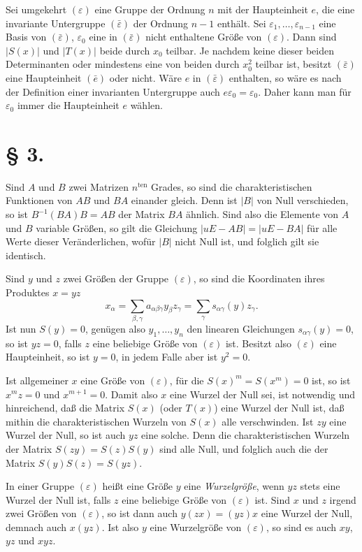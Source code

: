 \documentclass[11pt]{article}
\newcommand{\eps}{\varepsilon}
\newcommand{\ten}{\mathrm{ten}}
\begin{document}
Sei umgekehrt $(\eps)$ eine Gruppe der Ordnung $n$ mit der Haupteinheit $e$, die eine invariante Untergruppe $(\bar\eps)$ der Ordnung $n-1$ enthält. Sei $\eps_1,\ldots,\eps_{n-1}$ eine Basis von $(\bar\eps)$, $\eps_0$ eine in $(\bar\eps)$ nicht enthaltene Größe von $(\eps)$. Dann sind $|S(x)|$ und $|T(x)|$ beide durch $x_0$ teilbar. Je nachdem keine dieser beiden Determinanten oder mindestens eine von beiden durch $x_0^2$ teilbar ist, besitzt $(\bar\eps)$ eine Haupteinheit $(\bar e)$ oder nicht. Wäre $e$ in $(\bar\eps)$ enthalten, so wäre es nach der Definition einer invarianten Untergruppe auch $e\eps_0=\eps_0$. Daher kann man für $\eps_0$ immer die Haupteinheit $e$ wählen.

\section*{§ 3.}

Sind $A$ und $B$ zwei Matrizen $n^{\ten}$ Grades, so sind die charakteristischen Funktionen von $AB$ und $BA$ einander gleich. Denn ist $|B|$ von Null verschieden, so ist $B^{-1}(BA)B=AB$ der Matrix $BA$ ähnlich. Sind also die Elemente von $A$ und $B$ variable Größen, so gilt die Gleichung $|uE-AB|=|uE-BA|$ für alle Werte dieser Veränderlichen, wofür $|B|$ nicht Null ist, und folglich gilt sie identisch.

Sind $y$ und $z$ zwei Größen der Gruppe $(\eps)$, so sind die Koordinaten ihres Produktes $x=yz$
\begin{equation}\tag{1.}
 x_{\alpha}=\sum_{\beta,\gamma}a_{\alpha\beta\gamma}y_{\beta}z_{\gamma}
 =\sum_{\gamma}s_{\alpha\gamma}(y)z_{\gamma}.
\end{equation}
Ist nun $S(y)=0$, genügen also $y_1,\ldots,y_n$ den linearen Gleichungen $s_{\alpha\gamma}(y)=0$, so ist $yz=0$, falls $z$ eine beliebige Größe von $(\eps)$ ist. Besitzt also $(\eps)$ eine Haupteinheit, so ist $y=0$, in jedem Falle aber ist $y^2=0$.

Ist allgemeiner $x$ eine Größe von $(\eps)$, für die $S(x)^m=S(x^m)=0$ ist, so ist $x^mz=0$ und $x^{m+1}=0$. Damit also $x$ eine Wurzel der Null sei, ist notwendig und hinreichend, daß die Matrix $S(x)$ (oder $T(x)$) eine Wurzel der Null ist, daß mithin die charakteristischen Wurzeln von $S(x)$ alle verschwinden. Ist $zy$ eine Wurzel der Null, so ist auch $yz$ eine solche. Denn die charakteristischen Wurzeln der Matrix $S(zy)=S(z)S(y)$ sind alle Null, und folglich auch die der Matrix $S(y)S(z)=S(yz)$.

In einer Gruppe $(\eps)$ heißt eine Größe $y$ eine \emph{Wurzelgröße}, wenn $yz$ stets eine Wurzel der Null ist, falls $z$ eine beliebige Größe von $(\eps)$ ist. Sind $x$ und $z$ irgend zwei Größen von $(\eps)$, so ist dann auch $y(zx)=(yz)x$ eine Wurzel der Null, demnach auch $x(yz)$. Ist also $y$ eine Wurzelgröße von $(\eps)$, so sind es auch $xy$, $yz$ und $xyz$.
\end{document}
